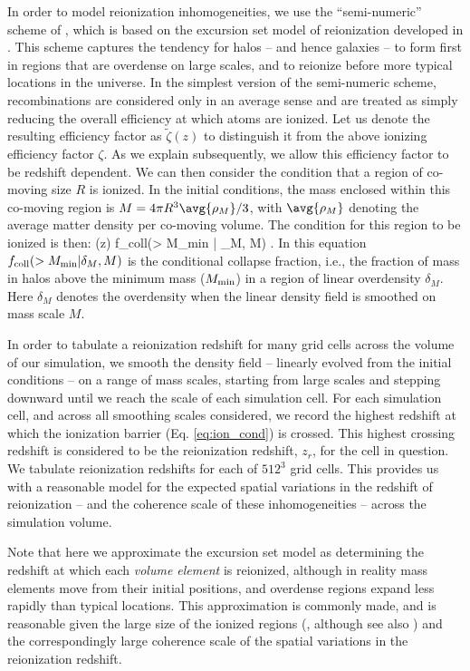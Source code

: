In order to 
model reionization inhomogeneities, we use the ``semi-numeric'' scheme of \citet{Zahn:2006sg}, which is based on the excursion set model of reionization developed
in \citet{Furlanetto:2004nh}.
This scheme captures the tendency for halos -- and hence galaxies -- to form first in
regions that are overdense on large scales, and to reionize before more typical locations in the universe. In the simplest version of the semi-numeric
scheme, recombinations are considered only in an average sense and are treated as simply reducing the overall efficiency at which atoms are ionized. Let us denote the resulting efficiency factor as $\tilde{\zeta}(z)$ to distinguish it from the above ionizing efficiency factor $\zeta$.
As we explain subsequently, we allow this efficiency factor to be redshift dependent. We can then consider the condition that
a region of co-moving size $R$ is ionized. In the initial conditions, the mass enclosed within this co-moving region is 
$M=4 \pi R^3 \avg{\rho_M}/3$, with $\avg{\rho_M}$ denoting the average matter density per co-moving volume. The condition for this
region to be ionized is then:
\beqa
\tilde{\zeta}(z) f_{\rm coll}(> M_{\rm min} | \delta_M, M) .
\label{eq:ion_cond}
\eeqa
In this equation $f_{\rm coll}(> M_{\rm min} | \delta_M, M)$ is the conditional collapse fraction, i.e., the fraction of mass in halos
above the minimum mass ($M_{\rm min}$) in a region of linear overdensity $\delta_M$. Here $\delta_M$ denotes the overdensity when the
linear density field is smoothed on mass scale $M$. 

In order to tabulate a reionization redshift for many grid cells across the volume
of our simulation, we smooth the density field -- linearly evolved from the initial conditions -- on a range of mass scales, starting from large scales and stepping downward until
we reach the scale of each simulation cell. For each simulation cell, and across all smoothing scales considered, we record
the highest redshift at which the ionization barrier (Eq. \ref{eq:ion_cond}) is crossed. This highest crossing redshift is considered
to be the reionization redshift, $z_r$, for the cell in question. We tabulate reionization redshifts for each 
of $512^3$ grid cells. This provides us with a reasonable model for the expected spatial variations in the redshift of 
reionization -- and the coherence scale of these inhomogeneities -- across the simulation volume. 

Note that here we approximate the excursion set model as determining the redshift at which each {\em volume element} is reionized, although
in reality mass elements move from their initial positions, and overdense regions expand less rapidly than typical locations. This approximation
is commonly made, and is reasonable given the large size of the ionized regions (\citealt{Furlanetto:2004nh}, although
see also \citealt{Paranjape:2014xca}) and the correspondingly large coherence scale of
the spatial variations in the reionization redshift.

